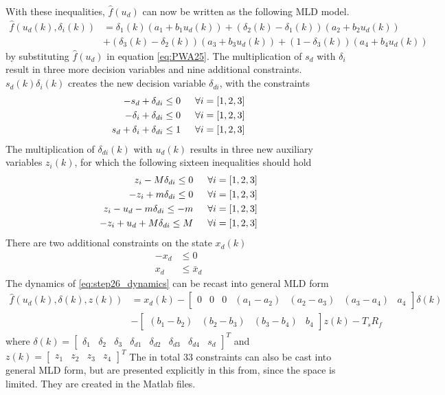 With these inequalities, $\hat{f}(u_d)$ can now be written as the following MLD model.
\begin{align}
   \hat{f}(u_d(k),\delta_i(k)) &= \delta_1(k)(a_1+b_1u_d(k)) + (\delta_2(k)-\delta_1(k))(a_2+b_2u_d(k))\\ &+ (\delta_3(k) - \delta_2(k))(a_3+b_3u_d(k)) + (1-\delta_3(k))(a_4+b_4u_d(k)) \label{eq:step26_dynamics}
\end{align}
by substituting $\hat{f}(u_d)$ in equation \ref{eq:PWA25}. The multiplication of $s_d$ with $\delta_i$ result in three more decision variables and nine additional constraints. $s_d(k)\delta_i(k)$ creates the new decision variable $\delta_{di}$, with the constraints
\begin{align*}
    -s_d + \delta_{di} \leq 0 \indent \forall i = [1,2,3]\\
    -\delta_i + \delta_{di} \leq 0 \indent \forall i = [1,2,3]\\
    s_d + \delta_i + \delta_{di} \leq 1 \indent \forall i = [1,2,3]
\end{align*}
The multiplication of $\delta_{di}(k)$ with $u_d(k)$ results in three new auxiliary variables $z_i(k)$, for which the following sixteen inequalities should hold
\begin{align*}
    z_i - M\delta_{di} \leq 0  \indent \forall i = [1,2,3]\\
    -z_i + m\delta_{di} \leq 0  \indent \forall i = [1,2,3]\\
    z_i - u_d -m\delta_{di} \leq -m \indent \forall i = [1,2,3]\\
    -z_i + u_d + M\delta_{di} \leq M  \indent \forall i = [1,2,3]\\
\end{align*}
There are two additional constraints on the state $x_d(k)$
\begin{align*}
    -x_d &\leq 0\\
x_d &\leq \bar{x}_d
\end{align*}
The dynamics of \ref{eq:step26_dynamics} can be recast into general MLD form
\begin{align*}
    \hat{f}(u_d(k),\delta(k),z(k)) &= x_d(k) - \begin{bmatrix} 0 & 0 & 0 & (a_1-a_2) & (a_2-a_3) & (a_3-a_4) & a_4 \end{bmatrix}\delta(k)\\ &- \begin{bmatrix} (b_1-b_2) & (b_2-b_3) & (b_3-b_4) & b_4 \end{bmatrix}z(k)  - T_sR_f
\end{align*}
where $\delta(k) = \begin{bmatrix} \delta_1 & \delta_2 & \delta_3 & \delta_{d1} & \delta_{d2} & \delta_{d3} & \delta_{d4} & s_d \end{bmatrix}^T$ and $z(k) = \begin{bmatrix} z_1 & z_2 & z_3 & z_4 \end{bmatrix}^T$ 
The in total 33 constraints can also be cast into general MLD form, but are presented explicitly in this from, since the space is limited. They are created in the Matlab files. 

